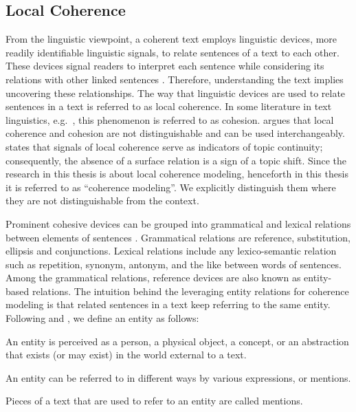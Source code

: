 \subsection{Local Coherence}

From the linguistic viewpoint, a coherent text employs linguistic devices, more readily identifiable linguistic signals, to relate sentences of a text to each other. 
These devices signal readers to interpret each sentence while considering its relations with other linked sentences \cite{vandijk77}. 
Therefore, understanding the text implies uncovering these relationships.  
The way that linguistic devices are used to relate sentences in a text is referred to as local coherence. 
In some literature in text linguistics, e.g.\ , this phenomenon is referred to as cohesion.   
 argues that local coherence and cohesion are not distinguishable and can be used interchangeably. 
 states that signals of local coherence serve as indicators of topic continuity; consequently, the absence of a surface relation is a sign of a topic shift. 
Since the research in this thesis is about local coherence modeling, henceforth in this thesis it is referred to as ``coherence modeling''. 
We explicitly distinguish them where they are not distinguishable from the context. 

Prominent cohesive devices can be grouped into grammatical and lexical relations between elements of sentences \cite{halliday76}. 
Grammatical relations are reference, substitution, ellipsis and conjunctions. 
Lexical relations include any lexico-semantic relation such as repetition, synonym, antonym, and the like between words of sentences. 
Among the grammatical relations, reference devices are also known as entity-based relations. 
The intuition behind the leveraging entity relations for coherence modeling is that related sentences in a text keep referring to the same entity. 
Following  and , we define an entity as follows: 

\begin{definition}
    An entity is perceived as a person, a physical object, a concept, or an abstraction that exists (or may exist) in the world external to a text.  
\end{definition}

An entity can be referred to in different ways by various expressions, or mentions. 

\begin{definition}
	Pieces of a text that are used to refer to an entity are called mentions. 
\end{definition}

